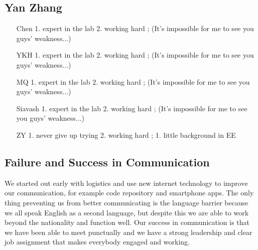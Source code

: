 \documentclass[a4paper]{article}
\begin{document}
\subsection{Yan Zhang}
\begin{itemize}
\item[Chen] 1. expert in the lab 2. working hard	;	(It's impossible for me to see you guys' weakness...)
\item[YKH]	1. expert in the lab 2. working hard	;	(It's impossible for me to see you guys' weakness...)
\item[MQ]	1. expert in the lab 2. working hard	;	(It's impossible for me to see you guys' weakness...)
\item[Siavash]	1. expert in the lab 2. working hard	;	(It's impossible for me to see you guys' weakness...)
\item[ZY]	1. never give up trying 2. working hard	;	1. little background in EE
\end{itemize}

\subsection*{Failure and Success in Communication}
We started out early with logistics and use new internet technology to improve our communication, for example
code repository and smartphone apps. The only thing preventing us from better communicating is the language barrier
because we all speak English as a second language, but despite this we are able to work beyond the nationality and
function well. Our success in communication is that we have been able to meet punctually and we have a strong
leadership and clear job assignment that makes everybody engaged and working.
\end{document}
